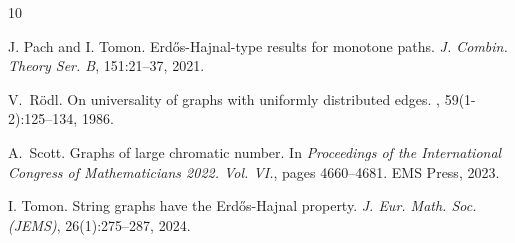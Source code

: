 \documentclass[11pt,reqno,a4paper]{amsart}
\begin{document}
\begin{thebibliography}{10}
		
		 J. Pach and I. Tomon. Erd\H os-Hajnal-type results for monotone paths. {\em J. Combin. Theory Ser. B}, 151:21--37, 2021.
		
		V.~R\"{o}dl.
		\newblock On universality of graphs with uniformly distributed edges.
		, 59(1-2):125--134, 1986.
		
		A.~Scott.
		\newblock Graphs of large chromatic number.
		\newblock In {\em Proceedings of the {I}nternational {C}ongress of
			{M}athematicians 2022. {V}ol. {VI}.}, pages 4660--4681. EMS Press, 2023.
		
		I. Tomon. String graphs have the Erd\H os-Hajnal property. {\em J. Eur. Math. Soc. (JEMS)}, 26(1):275--287, 2024.
		
	\end{thebibliography}
	
	
\end{document}
